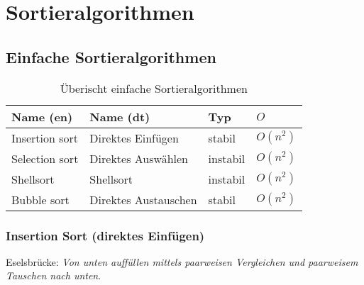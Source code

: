



\section{Sortieralgorithmen}

\subsection{Einfache Sortieralgorithmen}

\begin{table}[h!]
        \centering
        \begin{tabular}{l l l l}
                Name (en)
			& Name (dt) 
			& Typ
			& $O$ \\
                \hline
                Insertion sort
			& Direktes Einfügen
			& stabil       
			& $O(n^2)$ \\
                Selection sort 
			& Direktes Auswählen      
			& instabil       
			& $O(n^2)$ \\
                Shellsort   
			& Shellsort    
			& instabil       
			& $O(n^2)$ \\
                Bubble sort   
			& Direktes Austauschen   
			& stabil        
			& $O(n^2)$
        \end{tabular}
        \caption{Überischt einfache Sortieralgorithmen}
        \label{table:sorting-algorithms}
\end{table}

\subsubsection{Insertion Sort (direktes Einfügen)}
Eselsbrücke: \emph{Von unten auffüllen mittels paarweisen Vergleichen 
und paarweisem Tauschen nach unten}.

